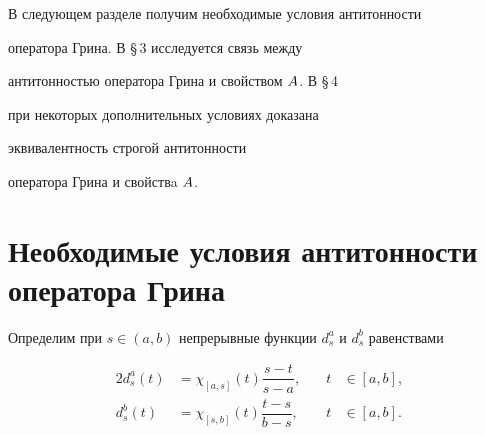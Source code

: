 В следующем разделе получим необходимые условия антитонности


оператора Грина. В \S\,3 исследуется связь между


антитонностью оператора Грина и свойством $A$. В \S\,4


при некоторых дополнительных условиях доказана


эквивалентность строгой антитонности


оператора Грина и свойствa $A$.





\section{Необходимые условия антитонности оператора Грина}





Определим при $s\in(a,b)$ непрерывные функции $d^a_s$ и $d^b_s$ равенствами


\begin{alignat*}{2}


d^a_s(t)&=\chi_{[a,s]}(t)\dfrac{s-t}{s-a},&\quad t&\in[a,b],\\


d^b_s(t)&=\chi_{[s,b]}(t)\dfrac{t-s}{b-s},&\quad t&\in[a,b].


\end{alignat*}





